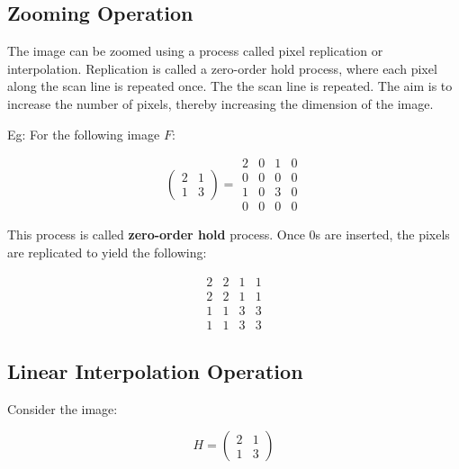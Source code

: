 \subsection{Zooming Operation}

The image can be zoomed using a process called pixel replication or interpolation.
Replication is called a zero-order hold process, where each pixel along the scan line is repeated once.
The the scan line is repeated.
The aim is to increase the number of pixels, thereby increasing the dimension of the image.

Eg: For the following image \textbf{$F$}:

\begin{equation}
    \begin{pmatrix}
        2 & 1\\
        1 & 3
    \end{pmatrix} = \begin{matrix}
        2 & 0 & 1 & 0\\
        0 & 0 & 0 & 0\\
        1 & 0 & 3 & 0\\
        0 & 0 & 0 & 0
    \end{matrix}
\end{equation}

This process is called \textbf{zero-order hold} process. Once 0s are inserted, the pixels are replicated to yield the following:

\begin{equation}
    \begin{matrix}
        2 & 2 & 1 & 1\\
        2 & 2 & 1 & 1\\
        1 & 1 & 3 & 3\\
        1 & 1 & 3 & 3
    \end{matrix}
\end{equation}

\subsection{Linear Interpolation Operation}

Consider the image:

\begin{equation*}
    H = \begin{pmatrix}
        2 & 1\\
        1 & 3
    \end{pmatrix}
\end{equation*}

